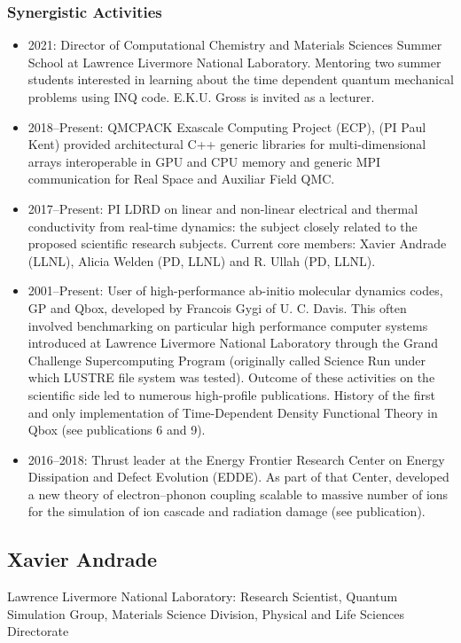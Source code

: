 \subsubsection*{Synergistic Activities}
\begin{itemize}
    \item 2021: Director of Computational Chemistry and Materials Sciences Summer School at Lawrence Livermore National Laboratory. Mentoring two summer students interested in learning about the time dependent quantum mechanical problems using INQ code. E.K.U. Gross is invited as a lecturer.
    \item 2018–Present: QMCPACK Exascale Computing Project (ECP), (PI Paul Kent) provided architectural C++ generic libraries for multi-dimensional arrays interoperable in GPU and CPU memory and generic MPI communication for Real Space and Auxiliar Field QMC.
    \item 2017–Present: PI LDRD on linear and non-linear electrical and thermal conductivity from real-time dynamics: the subject closely related to the proposed scientific research subjects. Current core members: Xavier Andrade (LLNL), Alicia Welden (PD, LLNL) and R. Ullah (PD, LLNL).
    \item 2001–Present: User of high-performance ab-initio molecular dynamics codes, GP and Qbox, developed by Francois Gygi of U. C. Davis. This often involved benchmarking on particular high performance computer systems introduced at Lawrence Livermore National Laboratory through the Grand Challenge Supercomputing Program (originally called Science Run under which LUSTRE file system was tested). Outcome of these activities on the scientific side led to numerous high-profile publications. History of the first and only implementation of Time-Dependent Density Functional Theory in Qbox (see publications 6 and 9).
    \item 2016–2018: Thrust leader at the Energy Frontier Research Center on Energy Dissipation and Defect Evolution (EDDE). As part of that Center, developed a new theory of electron–phonon coupling scalable to massive number of ions for the simulation of ion cascade and radiation damage (see publication).
\end{itemize}
\clearpage

\subsection*{Xavier Andrade}
Lawrence Livermore National Laboratory: Research Scientist, Quantum Simulation Group, Materials Science Division, Physical and Life Sciences Directorate

